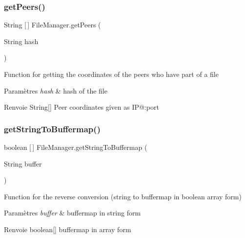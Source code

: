 \subsubsection{\texorpdfstring{get\+Peers()}{getPeers()}}
{\footnotesize\ttfamily String \mbox{[}$\,$\mbox{]} File\+Manager.\+get\+Peers (\begin{DoxyParamCaption}\item[{String}]{hash }\end{DoxyParamCaption})\hspace{0.3cm}{\ttfamily [inline]}}

Function for getting the coordinates of the peers who have part of a file


\begin{DoxyParams}{Paramètres}
{\em hash} & hash of the file \\
\hline
\end{DoxyParams}
\begin{DoxyReturn}{Renvoie}
String\mbox{[}\mbox{]} Peer coordinates given as IP@\+:port 
\end{DoxyReturn}
\mbox{\label{classFileManager_a1c9d6d3f954b6edac5a4542dcedc3aad}} 
\subsubsection{\texorpdfstring{get\+String\+To\+Buffermap()}{getStringToBuffermap()}}
{\footnotesize\ttfamily boolean \mbox{[}$\,$\mbox{]} File\+Manager.\+get\+String\+To\+Buffermap (\begin{DoxyParamCaption}\item[{String}]{buffer }\end{DoxyParamCaption})\hspace{0.3cm}{\ttfamily [inline]}}

Function for the reverse conversion (string to buffermap in boolean array form) 
\begin{DoxyParams}{Paramètres}
{\em buffer} & buffermap in string form \\
\hline
\end{DoxyParams}
\begin{DoxyReturn}{Renvoie}
boolean\mbox{[}\mbox{]} buffermap in array form 
\end{DoxyReturn}
\mbox{\label{classFileManager_a98ee226f2fed4c3734eeb15b0518ba59}} 
